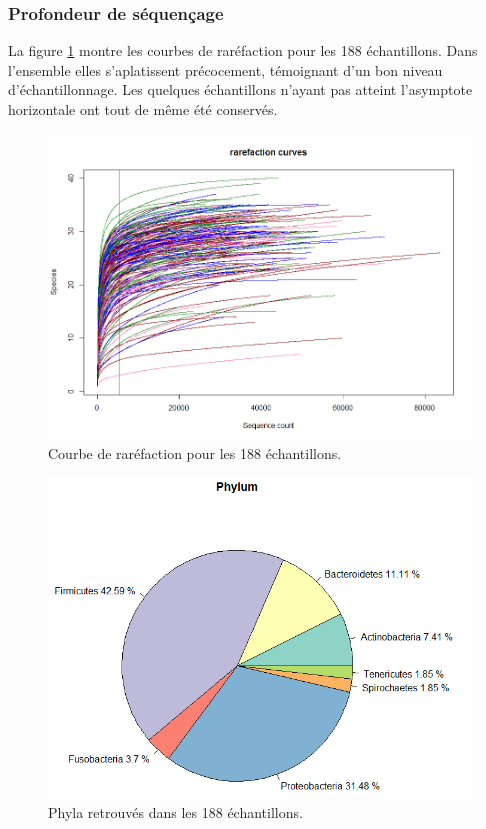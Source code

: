 \documentclass[12pt,a4paper]{article}
\begin{document}
\subsubsection{Profondeur de séquençage}
La figure \ref{rarefaction} montre les courbes de raréfaction pour les 188 échantillons.
Dans l'ensemble elles s’aplatissent précocement, témoignant d’un bon niveau d'échantillonnage. Les quelques échantillons n'ayant pas atteint l'asymptote horizontale ont tout de même été conservés.

\begin{figure}[H]
\begin{center}
\includegraphics[scale=0.5]{img/rarefaction.png}\hfill
\end{center}
\caption{Courbe de raréfaction pour les 188 échantillons. }
\label{rarefaction}
\end{figure}


\begin{figure}[!ht]
\begin{center}
\includegraphics[scale=0.5]{img/phylum.png}\hfill
\end{center}
\caption{Phyla retrouvés dans les 188 échantillons.}
\label{phylum}
\end{figure}
\end{document}

